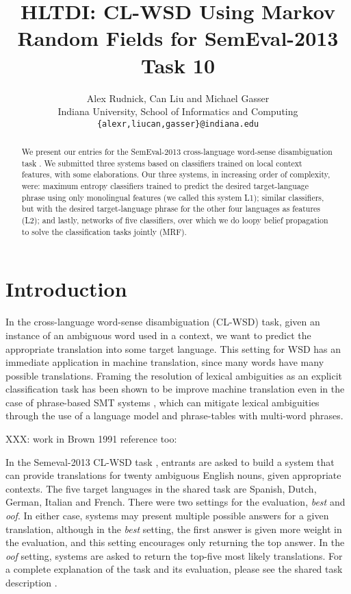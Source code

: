 \documentclass[11pt,letterpaper]{article}
\title{HLTDI: CL-WSD Using Markov Random Fields for SemEval-2013 Task 10}
\author{Alex Rudnick, Can Liu and Michael Gasser\\
	    Indiana University, School of Informatics and Computing \\
	    {\tt \{alexr,liucan,gasser\}@indiana.edu}}
\date{}
\begin{document}
\maketitle

\begin{abstract}
We present our entries for the SemEval-2013 cross-language word-sense
disambiguation task \cite{task10}. We submitted three systems based on
classifiers trained on local context features, with some elaborations. Our
three systems, in increasing order of complexity, were: maximum entropy
classifiers trained to predict the desired target-language phrase using only
monolingual features (we called this system L1); similar classifiers,
but with the desired target-language phrase for the other four languages as
features (L2); and lastly, networks of five classifiers, over which we
do loopy belief propagation to solve the classification tasks jointly
(MRF).
\end{abstract}

\section{Introduction}
In the cross-language word-sense disambiguation (CL-WSD) task, given an
instance of an ambiguous word used in a context, we want to predict the
appropriate translation into some target language. This setting for WSD has an
immediate application in machine translation, since many words have many
possible translations. Framing the resolution of lexical ambiguities as an
explicit classification task has been shown to be improve machine translation
even in the case of phrase-based SMT systems \cite{carpuatpsd}, which can
mitigate lexical ambiguities through the use of a language model and
phrase-tables with multi-word phrases.

XXX: work in Brown 1991 reference too: 
\cite{Brown91word-sensedisambiguation}

In the Semeval-2013 CL-WSD task \cite{task10}, entrants are asked to build a
system that can provide translations for twenty ambiguous English nouns, given
appropriate contexts. The five target languages in the shared task are Spanish,
Dutch, German, Italian and French. There were two settings for the evaluation,
\emph{best} and \emph{oof}. In either case, systems may present multiple
possible answers for a given translation, although in the \emph{best} setting,
the first answer is given more weight in the evaluation, and this setting
encourages only returning the top answer. In the \emph{oof} setting, systems
are asked to return the top-five most likely translations. For a complete
explanation of the task and its evaluation, please see the shared task
description \cite{task10}.
\end{document}
